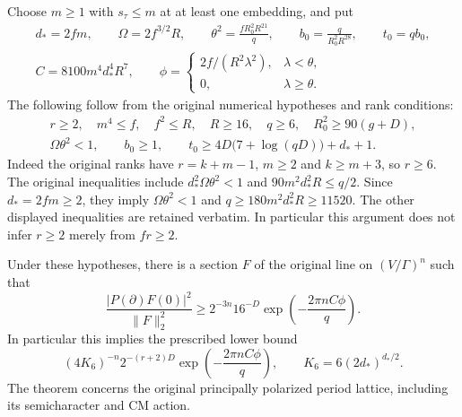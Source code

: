 Choose $m\ge1$ with $s_\tau\le m$ at at least one embedding, and
put
\begin{gather*}
 d_*=2fm,\qquad \Omega=2f^{3/2}R,\qquad
 \theta^2=\frac{fR_0^2R^{21}}q,\qquad
 b_0=\frac q{R_0^2R^{28}},\qquad t_0=qb_0,\\
 C=8100m^4d_*^4R^7,\qquad
 \phi=\begin{cases}2f/(R^2\lambda^2),&\lambda<\theta,\\
                    0,&\lambda\ge\theta.
       \end{cases}
\end{gather*}
The following follow from the original numerical hypotheses and rank
conditions:
\begin{gather}
 r\ge2,\quad m^4\le f,\quad f^2\le R,\quad R\ge16,
 \quad q\ge6,\quad R_0^2\ge90(g+D),\label{eq:thin-jet-parameters-a}\\
 \Omega\theta^2<1,\qquad b_0\ge1,\qquad
 t_0\ge4D\bigl(7+\log(qD)\bigr)+d_*+1.
 \label{eq:thin-jet-parameters-b}
\end{gather}
Indeed the original ranks have $r=k+m-1$, $m\ge2$ and
$k\ge m+3$, so $r\ge6$.  The original inequalities include
$d_*^2\Omega\theta^2<1$ and $90m^2d_*^2R\le q/2$.
Since $d_*=2fm\ge2$, they imply $\Omega\theta^2<1$ and
$q\ge180m^2d_*^2R\ge11520$.  The other displayed inequalities
are retained verbatim.  In particular this argument does not infer
$r\ge2$ merely from $fr\ge2$.

\begin{theorem}
\label{thm:actual-thin-determinant-jet}
Under these hypotheses, there is a section $F$ of the original
line on $(V/\Gamma)^n$ such that
\begin{equation}\label{eq:thin-jet-lower}
 \frac{|P(\partial)F(0)|^2}{\|F\|_2^2}
   \ge 2^{-3n}16^{-D}
                  \exp\left(-\frac{2\pi nC\phi}{q}\right).
\end{equation}
In particular this implies the prescribed lower bound
\[
 (4K_6)^{-n}2^{-(r+2)D}
                  \exp\left(-\frac{2\pi nC\phi}{q}\right),
 \qquad K_6=6(2d_*)^{d_*/2}.
\]
The theorem concerns the original principally polarized period
lattice, including its semicharacter and CM action.
\end{theorem}

